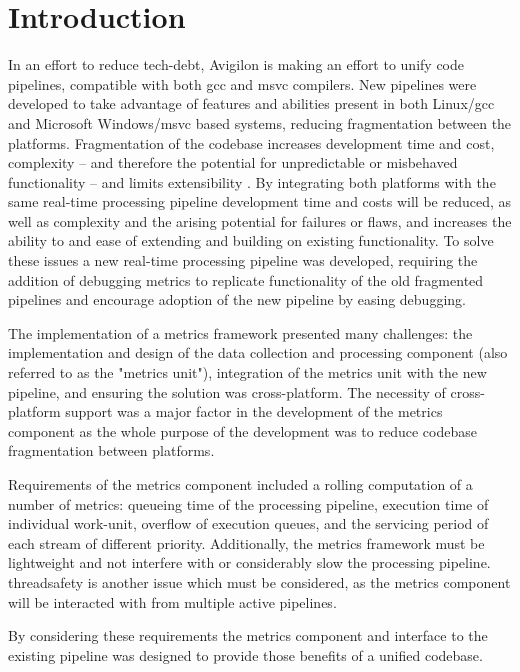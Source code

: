 \section{Introduction}

In an effort to reduce \gls{tech-debt}, Avigilon is making an effort to
unify code pipelines, compatible with both \gls{gcc} and \gls{msvc}
compilers. New pipelines were developed to take advantage of features
and abilities present in both Linux/\gls{gcc} and Microsoft Windows/\gls{msvc}
based systems, reducing fragmentation between the platforms. Fragmentation of
the codebase increases development time and cost, complexity -- and
therefore the potential for unpredictable or misbehaved functionality -- and
limits extensibility \cite{matjazkljun}. By integrating both platforms with
the same \gls{real-time} processing \gls{pipeline} development time and costs
will be reduced, as well as complexity and the arising potential for
failures or flaws, and increases the ability to and ease of extending and
building on existing functionality. To solve these issues a new \gls{real-time}
processing pipeline was developed, requiring the addition of debugging metrics
to replicate functionality of the old fragmented pipelines and encourage
adoption of the new pipeline by easing debugging.

The implementation of a metrics framework presented many challenges: the
implementation and design of the data collection and processing component (also
referred to as the "metrics unit"), integration of the metrics unit with the new
\gls{pipeline}, and ensuring the solution was cross-platform. The necessity
of cross-platform support was a major factor in the development of the metrics
component as the whole purpose of the development was to reduce codebase fragmentation
between platforms.

Requirements of the metrics component included a \gls{rolling} computation of
a number of metrics: queueing time of the processing pipeline, execution time of
individual \gls{work-unit}, overflow of execution queues, and the servicing
period of each \gls{stream} of different priority. Additionally, the metrics framework
must be lightweight and not interfere with or considerably slow the processing
pipeline. \Gls{threadsafe}ty is another issue which must be considered, as the
metrics component will be interacted with from multiple active pipelines.

By considering these requirements the metrics component and interface to the
existing \gls{pipeline} was designed to provide those benefits of a unified
codebase.

